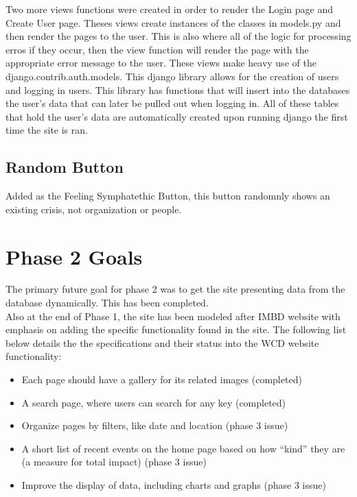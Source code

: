 \documentclass[12pt]{report}
\begin{document}
Two more views functions were created in order to render the Login page and Create User page. Theses views create instances of the classes in models.py and then render the pages to the user. This is also where all of the logic for processing erros if they occur, then the view function will render the page with the appropriate error message to the user. These views make heavy use of the django.contrib.auth.models. This django library allows for the creation of users and logging in users. This library has functions that will insert into the databases the user's data that can later be pulled out when logging in. All of these tables that hold the user's data are automatically created upon running django the first time the site is ran.

\subsection*{Random Button}
\hfill

Added as the Feeling Symphatethic Button, this button randomnly shows an existing crisis, not organization or people.

\newpage
\section*{Phase 2 Goals}
\hfill


The primary future goal for phase 2 was to get the site presenting data from the database dynamically. This has been completed.\\


Also at the end of Phase 1, the site has been modeled after IMBD website with emphasis on adding the specific functionality found in the site. The following list below details the the specifications and their status into the WCD website functionality:
\begin{itemize}
\item Each page should have a gallery for its related images (completed)
\item A search page, where users can search for any key (completed)
\item Organize pages by filters, like date and location (phase 3 issue)
\item A short list of recent events on the home page based on how ``kind'' they are (a measure for total impact) (phase 3 issue)
\item Improve the display of data, including charts and graphs (phase 3 issue)
\end{itemize}
\end{document}
